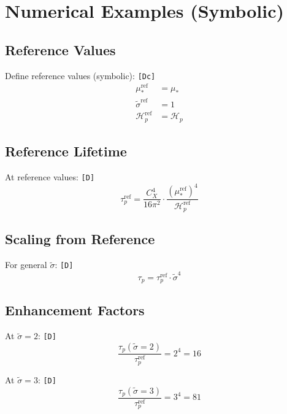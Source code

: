 \documentclass[11pt,a4paper]{article}
\newcommand{\tagD}{\textcolor{green!50!black}{\texttt{[D]}}}
\newcommand{\tagDc}{\textcolor{blue!70!black}{\texttt{[Dc]}}}
\theoremstyle{definition}
\begin{document}
\section{Numerical Examples (Symbolic)}
\label{app:numerical}

\subsection{Reference Values}
\label{app:reference}

Define reference values (symbolic): \tagDc{}
\begin{align}
\label{eq:ref-mustar}
\mu_*^{\text{ref}} &= \mu_* \\
\label{eq:ref-sigma}
\tilde{\sigma}^{\text{ref}} &= 1 \\
\label{eq:ref-hp}
\mathcal{H}_p^{\text{ref}} &= \mathcal{H}_p
\end{align}

\subsection{Reference Lifetime}
\label{app:ref-lifetime}

At reference values: \tagD{}
\begin{equation}
\label{eq:taup-ref}
\tau_p^{\text{ref}} = \frac{C_X^4}{16\pi^2} \cdot \frac{(\mu_*^{\text{ref}})^4}{\mathcal{H}_p^{\text{ref}}}
\end{equation}

\subsection{Scaling from Reference}
\label{app:scaling-ref}

For general $\tilde{\sigma}$: \tagD{}
\begin{equation}
\label{eq:taup-scaled}
\tau_p = \tau_p^{\text{ref}} \cdot \tilde{\sigma}^4
\end{equation}

\subsection{Enhancement Factors}
\label{app:enhancement-factors}

At $\tilde{\sigma} = 2$: \tagD{}
\begin{equation}
\label{eq:enhance-2}
\frac{\tau_p(\tilde{\sigma}=2)}{\tau_p^{\text{ref}}} = 2^4 = 16
\end{equation}

At $\tilde{\sigma} = 3$: \tagD{}
\begin{equation}
\label{eq:enhance-3}
\frac{\tau_p(\tilde{\sigma}=3)}{\tau_p^{\text{ref}}} = 3^4 = 81
\end{equation}
\end{document}
